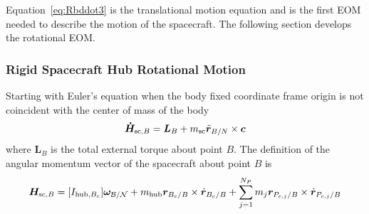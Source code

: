 Equation~\eqref{eq:Rbddot3} is the translational motion equation and is the first EOM needed to describe the motion of the spacecraft. The following section develops the rotational EOM.

\subsubsection{Rigid Spacecraft Hub Rotational Motion}

Starting with Euler's equation when the body fixed coordinate frame origin is not coincident with the center of mass of the body\cite{schaub}
\begin{equation}
	\bm{\dot{H}}_{\text{sc},B} = \bm{L}_B+m_{\text{\text{sc}}}\ddot{\bm r}_{B/N}\times\bm{c}
	\label{eq:Euler}
\end{equation}
where $\bm{L}_B$ is the total external torque about point $B$. The definition of the angular momentum vector of the spacecraft about point $B$ is
\begin{equation}
	\bm{H}_{\text{sc},B} = [I_{\text{hub},B_c}] \bm\omega_{\cal B/N} + m_{\text{\text{hub}}}\bm{r}_{B_{c}/B} \times \dot{\bm{r}}_{B_{c}/B} + \sum\limits_{j=1}^{N_P}m_j \bm r_{P_{c,j}/B}\times \dot{\bm r}_{P_{c,j}/B}
	\label{eq:Hb2}
\end{equation}

